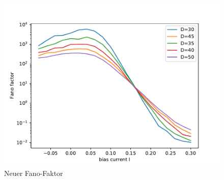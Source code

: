 \documentclass[12pt,a4paper]{article}
\begin{document}
\begin{figure}[H]
	\centering
	\includegraphics[scale=0.9]{f26.pdf}
	\caption{Neuer Fano-Faktor}
	\label{fano}
\end{figure}
\end{document}
